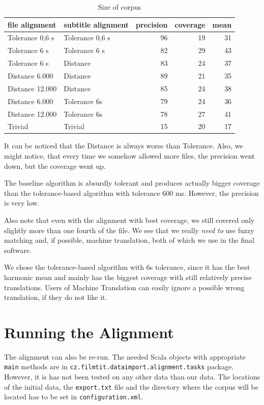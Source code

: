 \begin{table}[h]
\begin{center}
\begin{tabular}{|l|l|r|r|r|}
    \hline
    \textbf{file alignment} & \textbf{subtitle alignment} & \textbf{precision} & \textbf{coverage} & \textbf{mean} \\ \hline
    Tolerance 0,6 s & Tolerance 0,6 s & 96  & 19  & 31 \\ \hline
    Tolerance 6 s & Tolerance 6 s & 82  & 29 & 43 \\ \hline
    Tolerance 6 s & Distance & 83 & 24 & 37 \\ \hline
    Distance 6.000 & Distance &  89 & 21 & 35 \\ \hline
    Distance 12.000 & Distance & 85 & 24 & 38 \\ \hline
    Distance 6.000 & Tolerance 6s & 79 & 24 & 36 \\ \hline
    Distance 12.000 & Tolerance 6s & 78 & 27 & 41 \\ \hline
    Trivial & Trivial & 15 & 20 & 17 \\ \hline
    
\end{tabular}
\end{center}

\caption{Size of corpus}\label{tm_simulation}
\end{table}

It can be noticed that the Distance is always worse than Tolerance. Also, we might notice, that every time we somehow allowed more files, the precision went down, but the coverage went up.

The baseline algorithm is absurdly tolerant and produces actually bigger coverage than the tolerance-based algorithm with tolerance 600 ms. However, the precision is very low.

Also note that even with the alignment with best coverage, we still covered only slightly more than one fourth of the file. We see that we really \emph{need to} use fuzzy matching and, if possible, machine translation, both of which we use in the final software.

We chose the tolerance-based algorithm with 6s tolerance, since it has the best harmonic mean and mainly has the biggest coverage with still relatively precise translations. Users of Machine Translation can easily ignore a possible wrong translation, if they do not like it.

\section{Running the Alignment}
The alignment can also be re-run. The needed Scala objects with appropriate \texttt{main} methods are in \texttt{cz.filmtit.dataimport.alignment.tasks} package. However, it is has not been tested on any other data than our data. The locations of the initial data, the \texttt{export.txt} file and the directory where the corpus will be located has to be set in \texttt{configuration.xml}.

